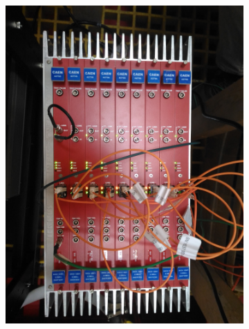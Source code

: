 \begin{figure}
  \begin{subfigure}{0.45\linewidth}
    \includegraphics[width=\textwidth]{figures/ReadoutCrate-standard}
  \end{subfigure}
  \begin{subfigure}{0.55\linewidth}

\end{subfigure}
\end{figure}
